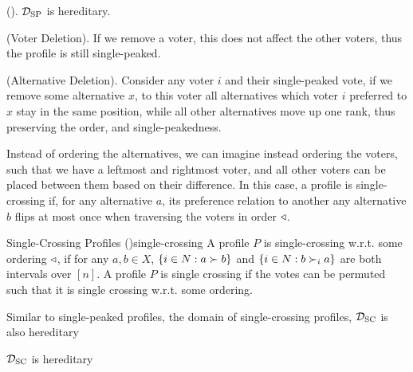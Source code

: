 \begin{proposition}{\textnormal{(\citet{elkindPreferenceRestrictionsComputational2022}).}}
	$\mathcal{D}_{\textnormal{SP}}$ is hereditary.
\end{proposition}

\begin{proofc}
	(Voter Deletion). If we remove a voter, this does not affect the other voters, thus the profile is still single-peaked.~\checkmark

	(Alternative Deletion). Consider any voter $i$ and their single-peaked vote, if we remove some alternative $x$, to this voter all alternatives which voter $i$ preferred to $x$ stay in the same position, while all other alternatives move up one rank, thus preserving the order, and single-peakedness.~\checkmark
\end{proofc}


Instead of ordering the alternatives, we can imagine instead ordering the voters, such that we have a leftmost and rightmost voter, and all other voters can be placed between them based on their difference. In this case, a profile is single-crossing if, for any alternative $a$, its preference relation to another any alternative $b$ flips at most once when traversing the voters in order $\triangleleft$.

\begin{definition}{Single-Crossing Profiles \textnormal{(\citet{elkindPreferenceRestrictionsComputational2022})}}{single-crossing}
	A profile $P$ is single-crossing w.r.t. some ordering $\triangleleft$, if for any $a,b \in X$, $\{i \in N : a \succ b\}$ and $\{i \in N: b \succ_{i} a\}$ are both intervals over $[n]$. A profile $P$ is single crossing if the votes can be permuted such that it is single crossing w.r.t. some ordering.
\end{definition}

Similar to single-peaked profiles, the domain of single-crossing profiles, $\mathcal{D}_{\textnormal{SC}}$ is also hereditary

\begin{proposition}
	$\mathcal{D}_{\textnormal{SC}}$ is hereditary
\end{proposition}

